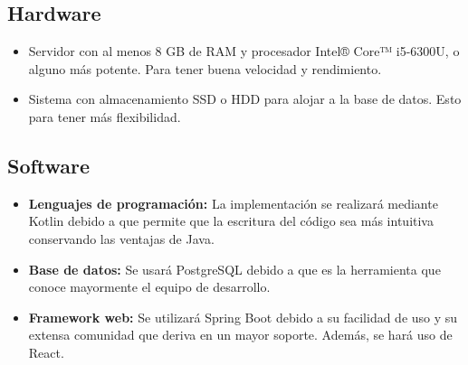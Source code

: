 \subsection{Hardware}
\begin{itemize}
    \item Servidor con al menos 8 GB de RAM y procesador Intel® Core™ i5-6300U, o alguno más potente. Para tener buena velocidad y rendimiento.
    \item Sistema con almacenamiento SSD o HDD para alojar a la base de datos. Esto para tener más flexibilidad.
\end{itemize}

\subsection{Software}
\begin{itemize}
    \item \textbf{Lenguajes de programación:} La implementación se realizará mediante Kotlin debido a que permite que la escritura del código sea más intuitiva conservando las ventajas de Java.
    \item \textbf{Base de datos:} Se usará PostgreSQL debido a que es la herramienta que conoce mayormente el equipo de desarrollo.
    \item \textbf{Framework web:} Se utilizará Spring Boot debido a su facilidad de uso y su extensa comunidad que deriva en un mayor soporte. Además, se hará uso de React.
\end{itemize}
